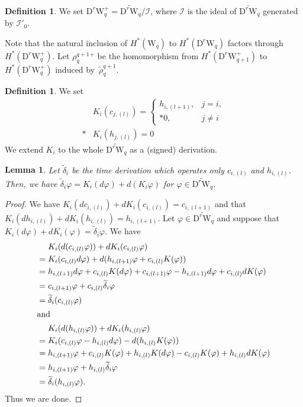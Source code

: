 \documentclass[12pt]{amsart}
\newcommand{\W}{\mathrm{W}}
\newcommand{\D}{\mathrm{D}}
\newtheorem{lemma}[theorem]{Lemma}
\theoremstyle{definition}
\newtheorem{definition}[theorem]{Definition}
\theoremstyle{remark}
\begin{document}
\begin{definition}
We set $\D^r\W_q^+=\widetilde{\D^r\W_q}/\mathcal{I}$, where $\mathcal{I}$ is the ideal of $\widetilde{\D^r\W_q}$ generated by $\mathscr{I}'_0$.
\end{definition}

Note that the natural inclusion of $H^*(\W_q)$ to $H^*(\D^r\W_q)$ factors through $H^*(\D^r\W_q^+)$.
Let $\rho^{q+1}_q{}^+$ be the homomorphism from $H^*(\D^r\W_{q+1}^+)$ to $H^*(\D^r\W_q^+)$ induced by~$\widetilde\rho^{q+1}_q$.

\begin{definition}
We set
\begin{align*}
&K_i(c_{j,(l)})=\begin{cases}
h_{i,(l+1)}, & j=i,\\*
0, & j\neq i
\end{cases}\\*
&K_i(h_{j,(l)})=0
\end{align*}
We extend $K_i$ to the whole $\widetilde{\D^r\W_q}$ as a (signed) derivation.
\end{definition}

\begin{lemma}
\label{lem7.10}
Let $\widetilde\delta_i$ be the time derivation which operates only $c_{i,(l)}$ and $h_{i,(l)}$.
Then, we have $\widetilde\delta_i\varphi=K_i(d\varphi)+d(K_i\varphi)$\/ for $\varphi\in\widetilde{\D^r\W_q}$.
\end{lemma}
\begin{proof}
We have $K_i(dc_{i,(l)})+dK_i(c_{i,(l)})=c_{i,(l+1)}$ and that $K_i(dh_{i,(l)})+dK_i(h_{i,(l)})=h_{i,(l+1)}$.
Let $\varphi\in\widetilde{\D^r\W_q}$ and suppose that $K_i(d\varphi)+dK_i(\varphi)=\widetilde\delta_i\varphi$.
We have
\begin{align*}
&\hphantom{{}={}}%
K_i(d(c_{i,(l)}\varphi))+dK_i(c_{i,(l)}\varphi)\\*%
&=K_i(c_{i,(l)}d\varphi)+d(h_{i,(l+1)}\varphi+c_{i,(l)}K(\varphi))\\*
&=h_{i,(l+1)}d\varphi+c_{i,(l)}K(d\varphi)+c_{i,(l+1)}\varphi-h_{i,(l+1)}d\varphi+c_{i,(l)}dK(\varphi)\\*
&=c_{i,(l+1)}\varphi+c_{i,(l)}\widetilde{\delta}_i\varphi\\*
&=\widetilde\delta_i(c_{i,(l)}\varphi)
\\
\intertext{and}
&\hphantom{{}={}}%
K_i(d(h_{i,(l)}\varphi))+dK_i(h_{i,(l)}\varphi)\\*%
&=K_i(c_{i,(l)}\varphi-h_{i,(l)}d\varphi)-d(h_{i,(l)}K(\varphi))\\*
&=h_{i,(l+1)}\varphi+c_{i,(l)}K(\varphi)+h_{i,(l)}K(d\varphi)-c_{i,(l)}K(\varphi)+h_{i,(l)}dK(\varphi)\\*
&=h_{i,(l+1)}\varphi+h_{i,(l)}\widetilde{\delta}_i\varphi\\*
&=\widetilde\delta_i(h_{i,(l)}\varphi).
\end{align*}
Thus we are done.
\end{proof}
\end{document}
